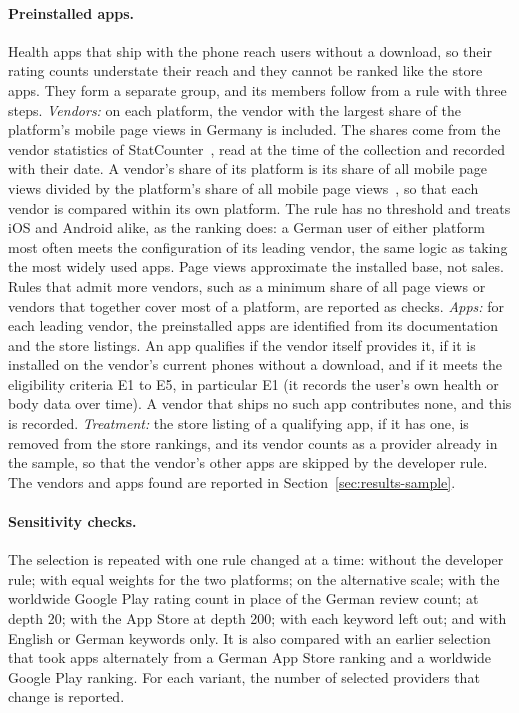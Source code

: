 \paragraph{Preinstalled apps.} Health apps that ship with the phone reach
users without a download, so their rating counts understate their reach and
they cannot be ranked like the store apps. They form a separate group, and
its members follow from a rule with three steps.
\emph{Vendors:} on each platform, the vendor with the largest share of the
platform's mobile page views in Germany is included. The shares come from the
vendor statistics of StatCounter~\parencite{statcounter2026vendor}, read at the
time of the collection and recorded with their date. A vendor's share of its
platform is its share of all mobile page views divided by the platform's share
of all mobile page views~\parencite{statcounter2026os}, so that each vendor is
compared within its own platform. The rule has no threshold and treats iOS and
Android alike, as the ranking does: a German user of either platform most often
meets the configuration of its leading vendor, the same logic as taking the
most widely used apps. Page views approximate the installed base, not sales.
Rules that admit more vendors, such as a minimum share of all page views or
vendors that together cover most of a platform, are reported as checks.
\emph{Apps:} for each leading vendor, the preinstalled apps are identified from
its documentation and the store listings. An app qualifies if the vendor itself
provides it, if it is installed on the vendor's current phones without a
download, and if it meets the eligibility criteria E1 to E5, in particular E1
(it records the user's own health or body data over time). A vendor that ships
no such app contributes none, and this is recorded.
\emph{Treatment:} the store listing of a qualifying app, if it has one, is
removed from the store rankings, and its vendor counts as a provider already in
the sample, so that the vendor's other apps are skipped by the developer rule.
The vendors and apps found are reported in Section~\ref{sec:results-sample}.

\paragraph{Sensitivity checks.} The selection is repeated with one rule changed
at a time: without the developer rule; with equal weights for the two
platforms; on the alternative scale; with the worldwide Google Play rating count
in place of the German review count; at depth 20; with the App Store at depth
200; with each keyword left out; and with English or German keywords only. It
is also compared with an earlier selection that took apps alternately from a
German App Store ranking and a worldwide Google Play ranking. For each variant,
the number of selected providers that change is reported.

